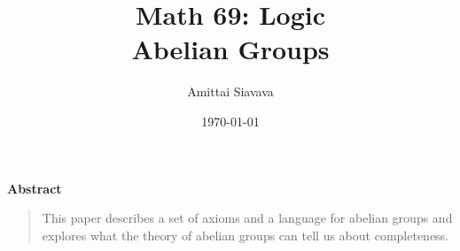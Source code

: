 \title{
  \Huge{Math 69: Logic}\\
  Abelian Groups
}
\date{\Large{\today}}

\begin{titlingpage}

  \author{\Large{Amittai Siavava}}
  \maketitle

  \step
  \begin{center}
    \textbf{Abstract}
  \end{center}
  \step
  \begin{quote}
    \small
    This paper describes a set of axioms and a language for abelian groups
    and explores what the theory of abelian groups can tell us
    about completeness.

    \step
  \end{quote}
\end{titlingpage}
